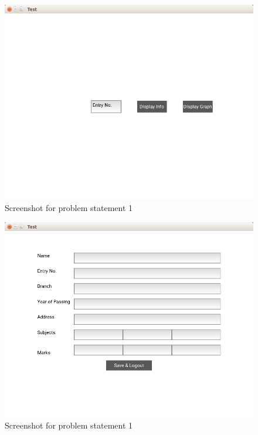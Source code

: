 \documentclass[11pt]{report}
\begin{document}
	\begin{figure}[h!]
	\centering
	\includegraphics[scale=0.8, center]{images/screenshot5}
	\caption{Screenshot for problem statement 1}
	\end{figure}
	\begin{figure}[h!]
	\centering
	\includegraphics[scale=0.8, center]{images/screenshot6}
	\caption{Screenshot for problem statement 1}
	\end{figure}
	\pagebreak
	\iffalse
\end{document}
